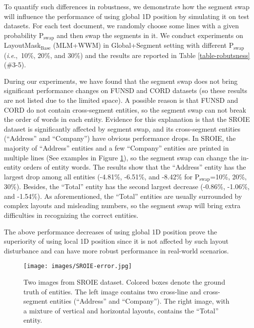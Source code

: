 \documentclass[11pt]{article}
\newcommand{\ie}{\textit{i}.\textit{e}.,\ }
\begin{document}
To quantify such differences in robustness, we demonstrate how the segment swap will influence the performance of using global 1D position by simulating it on test datasets.
For each test document, we randomly choose some lines with a given probability $\mathrm{P}_\mathrm{swap}$ and then swap the segments in it. 
We conduct experiments on LayoutMask$_\mathrm{Base}$ (MLM+WWM) in Global+Segment setting with different $\mathrm{P}_\mathrm{swap}$ (\ie 10\%, 20\%, and 30\%) and the results are reported in Table \ref{table-robutsness} (\#3-5).

During our experiments, we have found that the segment swap does not bring significant performance changes on FUNSD and CORD datasets (so these results are not listed due to the limited space). 
A possible reason is that FUNSD and CORD do not contain cross-segment entities, so the segment swap can not break the order of words in each entity. 
Evidence for this explanation is that the SROIE dataset is significantly affected by segment swap, and its cross-segment entities (``Address'' and ``Company'') have obvious performance drops.
In SROIE, the majority of ``Address'' entities and a few ``Company'' entities are printed in multiple lines (See examples in Figure \ref{fig:sroie-error}), so the segment swap can change the in-entity orders of entity words. The results show that the ``Address'' entity has the largest drop among all entities (-4.81\%, -6.51\%, and -8.42\% for $\mathrm{P}_\mathrm{swap}$=10\%, 20\%, 30\%).
Besides, the ``Total'' entity has the second largest decrease (-0.86\%, -1.06\%, and -1.54\%). 
As aforementioned, the ``Total'' entities are usually surrounded by complex layouts and misleading numbers, so the segment swap will bring extra difficulties in recognizing the correct entities. 

The above performance decreases of using global 1D position prove the superiority of using local 1D position since it is not affected by such layout disturbance and can have more robust performance in real-world scenarios.


\begin{figure}[t]
	\centering
	\texttt{[image: images/SROIE-error.jpg]}
	\caption{Two images from SROIE dataset. Colored boxes denote the ground truth of entities. The left image contains two cross-line and cross-segment entities (``Address'' and ``Company''). The right image, with a mixture of vertical and horizontal layouts, contains the ``Total'' entity.}
	\label{fig:sroie-error}
\end{figure}
\end{document}
